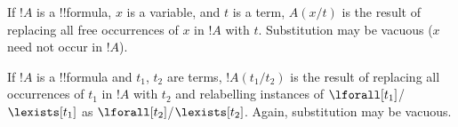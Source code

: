 \documentclass[../../include/open-logic-section]{subfiles}
\begin{document}



\begin{defn}
If $!A$ is a !!{formula}, $x$ is a variable, and $t$ is a term, $A(x/t)$
is the result of replacing all free occurrences of $x$ in $!A$ with
$t$. Substitution may be vacuous ($x$ need not occur in $!A$).
\end{defn}

\begin{defn}
If $!A$ is a !!{formula} and $t_1$, $t_2$ are terms, $!A(t_1/t_2)$ is
the result of replacing all occurrences of $t_1$ in $!A$ with $t_2$
and relabelling instances of $\lforall[t_1]$/$\lexists[t_1]$ as
$\lforall[t_2]$/$\lexists[t_2]$. Again, substitution may be vacuous.
\end{defn}
\end{document}
